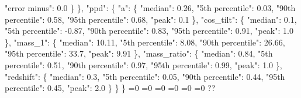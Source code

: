 {{          "error minus": 0.0%
        \}%
      \}, %
      "ppd": \{%
        "a": \{%
          "median": 0.26, %
          "5th percentile": 0.03, %
          "90th percentile": 0.58, %
          "95th percentile": 0.68, %
          "peak": 0.1%
        \}, %
        "cos\_tilt": \{%
          "median": 0.1, %
          "5th percentile": {-}0.87, %
          "90th percentile": 0.83, %
          "95th percentile": 0.91, %
          "peak": 1.0%
        \}, %
        "mass\_1": \{%
          "median": 10.11, %
          "5th percentile": 8.08, %
          "90th percentile": 26.66, %
          "95th percentile": 33.7, %
          "peak": 9.91%
        \}, %
        "mass\_ratio": \{%
          "median": 0.84, %
          "5th percentile": 0.51, %
          "90th percentile": 0.97, %
          "95th percentile": 0.99, %
          "peak": 1.0%
        \}, %
        "redshift": \{%
          "median": 0.3, %
          "5th percentile": 0.05, %
          "90th percentile": 0.44, %
          "95th percentile": 0.45, %
          "peak": 2.0%
        \}%
      \}%
    \}}%
  \else%
    \ifnum{}=0%
      \def\MagBetaConstrainedIidTiltIsotropicAlignedNid@out{%
    {-}1032.94}%
    \else%
      \ifnum{}=0%
      \def\MagBetaConstrainedIidTiltIsotropicAlignedNid@out{%
    0.24}%
    \else%
      \ifnum{}=0%
      \def\MagBetaConstrainedIidTiltIsotropicAlignedNid@out{%
    {-}0.65}%
    \else%
      \ifnum{}=0%
      \def\MagBetaConstrainedIidTiltIsotropicAlignedNid@out{%
    0.0}%
    \else%
      \ifnum{}=0%
      \let\MagBetaConstrainedIidTiltIsotropicAlignedNid@out\MagBetaConstrainedIidTiltIsotropicAlignedNid@I%
    \else%
      \ifnum{}=0%
      \let\MagBetaConstrainedIidTiltIsotropicAlignedNid@out\MagBetaConstrainedIidTiltIsotropicAlignedNid@II%
    \else%
      \def\MagBetaConstrainedIidTiltIsotropicAlignedNid@out{%
    ??}%
    \fi\fi\fi\fi\fi\fi
  \fi
  \MagBetaConstrainedIidTiltIsotropicAlignedNid@out
}\newcommand\MagBetaConstrainedIidTiltIsotropicAlignedNid@I[1][all]{%
  \ifnum\pdfstrcmp{#1}{all}=0%
    \def\MagBetaConstrainedIidTiltIsotropicAlignedNid@I@out{%
    \{%
      "alpha\_1": \{%
        "median": 1.83, %
        "5th percentile": {-}0.08, %
        "95th percentile": 3.15, %
        "error plus": 1.31, %
        "error minus": 1.91%
      \}, %
      "alpha\_2": \{%
        "median": 4.65, %
        "5th percentile": 3.24, %
        "95th percentile": 6.25, %
        "error plus": 1.6, %
}}
